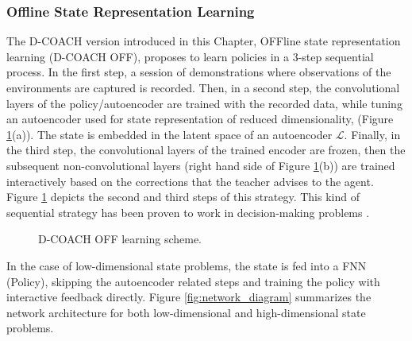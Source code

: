 \subsubsection{Offline State Representation Learning}
The D-COACH version introduced in this Chapter, OFFline state representation learning (D-COACH OFF), proposes to learn policies in a 3-step sequential process. In the first step, a session of demonstrations where observations of the environments are captured is recorded. Then, in a second step, the convolutional layers of the policy/autoencoder are trained with the recorded data, while tuning an  autoencoder  used  for state representation of reduced dimensionality, (Figure \ref{fig:ms}(a)). The state is embedded in the latent space of an autoencoder $\mathcal{L}$. Finally, in the third step, the convolutional layers of the trained encoder are frozen, then the subsequent non-convolutional layers (right hand side of Figure \ref{fig:ms}(b)) are trained interactively based on the corrections that the teacher advises to the agent. Figure \ref{fig:ms} depicts the second and third steps of this strategy. This kind of sequential strategy has been proven to work in decision-making problems \cite{Warnell2017,Finn2015,Ha2018}.

\begin{figure}[h]
\centering
{}
\hspace{0.1cm}
\caption{D-COACH OFF learning scheme.} 
\label{fig:ms} 
\end{figure}

In the case of low-dimensional state problems, the state is fed into a FNN (Policy), skipping the autoencoder related steps and training the policy with interactive feedback directly. Figure \ref{fig:network_diagram} summarizes the network architecture for both low-dimensional and high-dimensional state problems.

